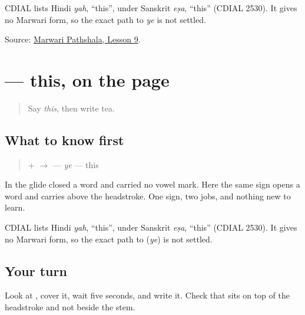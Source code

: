 \begin{cousinweb}
CDIAL lists Hindi \emph{yah}, \textquotedblleft{}this\textquotedblright{}, under Sanskrit \emph{eṣa}, \textquotedblleft{}this\textquotedblright{} (CDIAL 2530). It gives no Marwari form, so the exact path to \emph{ye} is not settled.
\end{cousinweb}

\begin{tcolorbox}[breakable,colback=teal!4,colframe=teal!35!black,title={Before you move on}]
Source: \href{https://www.marwaripathshala.com/marwari-lesson-9-english}{Marwari Pathshala, Lesson 9}.
\end{tcolorbox}
\section[\texorpdfstring{\mw{ये} (ye)}{ये (ye)}]{ — this, on the page}

\label{lesson:MW-C21-ye}



\begin{quote}
Say \emph{this}, then write tea.
\end{quote}

\subsection*{What to know first}
\begin{quote}
\textbf{} + \textbf{} $\to$ \textbf{} — \emph{ye} — this
\end{quote}

In \textbf{} the glide \textbf{} closed a word and carried no vowel mark. Here the same sign opens a word and carries \textbf{} above the headstroke. One sign, two jobs, and nothing new to learn.

\begin{cousinweb}
CDIAL lists Hindi \emph{yah}, \textquotedblleft{}this\textquotedblright{}, under Sanskrit \emph{eṣa}, \textquotedblleft{}this\textquotedblright{} (CDIAL 2530). It gives no Marwari form, so the exact path to \textbf{} (\emph{ye}) is not settled.
\end{cousinweb}

\subsection*{Your turn}
Look at \textbf{}, cover it, wait five seconds, and write it. Check that \textbf{} sits on top of the headstroke and not beside the stem.


